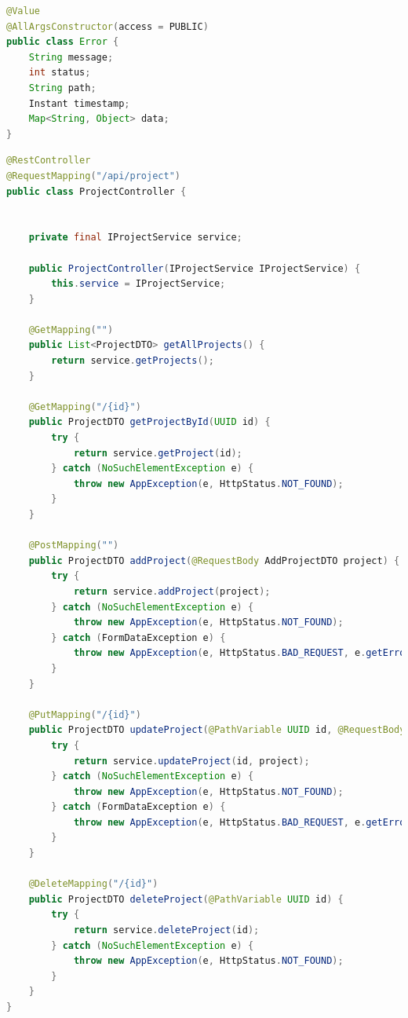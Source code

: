 \begin{lstlisting}[language=Java, caption={Class \textit{Error}}, label={lst:class-Error}]
@Value
@AllArgsConstructor(access = PUBLIC)
public class Error {
    String message;
    int status;
    String path;
    Instant timestamp;
    Map<String, Object> data;
}
\end{lstlisting}

\begin{lstlisting}[language=Java, caption={Class \textit{ProjectController}}, label={lst:class-ProjectController}]
@RestController
@RequestMapping("/api/project")
public class ProjectController {


    private final IProjectService service;

    public ProjectController(IProjectService IProjectService) {
        this.service = IProjectService;
    }

    @GetMapping("")
    public List<ProjectDTO> getAllProjects() {
        return service.getProjects();
    }

    @GetMapping("/{id}")
    public ProjectDTO getProjectById(UUID id) {
        try {
            return service.getProject(id);
        } catch (NoSuchElementException e) {
            throw new AppException(e, HttpStatus.NOT_FOUND);
        }
    }

    @PostMapping("")
    public ProjectDTO addProject(@RequestBody AddProjectDTO project) {
        try {
            return service.addProject(project);
        } catch (NoSuchElementException e) {
            throw new AppException(e, HttpStatus.NOT_FOUND);
        } catch (FormDataException e) {
            throw new AppException(e, HttpStatus.BAD_REQUEST, e.getErrors());
        }
    }

    @PutMapping("/{id}")
    public ProjectDTO updateProject(@PathVariable UUID id, @RequestBody @Valid AddProjectDTO project) {
        try {
            return service.updateProject(id, project);
        } catch (NoSuchElementException e) {
            throw new AppException(e, HttpStatus.NOT_FOUND);
        } catch (FormDataException e) {
            throw new AppException(e, HttpStatus.BAD_REQUEST, e.getErrors());
        }
    }

    @DeleteMapping("/{id}")
    public ProjectDTO deleteProject(@PathVariable UUID id) {
        try {
            return service.deleteProject(id);
        } catch (NoSuchElementException e) {
            throw new AppException(e, HttpStatus.NOT_FOUND);
        }
    }
}
\end{lstlisting}

